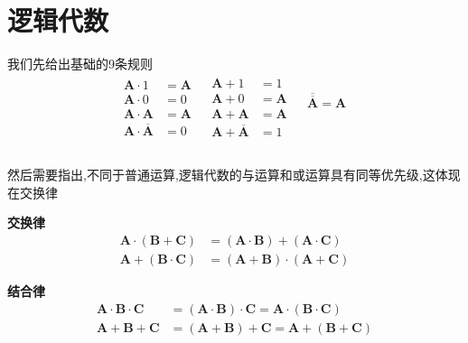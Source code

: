 \section{\K 逻辑代数}
\Par 我们先给出基础的9条规则
\begin{equation*}
    \begin{matrix}
        \begin{aligned}
        \boldsymbol{A}\cdot 1&=\boldsymbol{A}\\
        \boldsymbol{A}\cdot 0&=0\\
        \boldsymbol{A}\cdot \boldsymbol{A}&=\boldsymbol{A}\\
        \boldsymbol{A}\cdot \overline{\boldsymbol{A}}&=0\\
    \end{aligned}&		\begin{aligned}
        \boldsymbol{A}+1&=1\\
        \boldsymbol{A}+0&=\boldsymbol{A}\\
        \boldsymbol{A}+\boldsymbol{A}&=\boldsymbol{A}\\
        \boldsymbol{A}+\overline{\boldsymbol{A}}&=1\\
    \end{aligned}&		\begin{array}{c}
        \overline{\overline{\boldsymbol{A}}}=\boldsymbol{A}\\
        \\
        \\
        \\
    \end{array}\\
    \end{matrix}
\end{equation*}

然后需要指出,不同于普通运算,逻辑代数的与运算和或运算具有同等优先级,这体现在交换律

\textbf{交换律}
\begin{align}
	\boldsymbol{A}\cdot \left( \boldsymbol{B}+\boldsymbol{C} \right) &=\left( \boldsymbol{A}\cdot \boldsymbol{B} \right) +\left( \boldsymbol{A}\cdot \boldsymbol{C} \right)\\
	\boldsymbol{A}+\left( \boldsymbol{B}\cdot \boldsymbol{C} \right) &=\left( \boldsymbol{A}+\boldsymbol{B} \right) \cdot \left( \boldsymbol{A}+\boldsymbol{C} \right)
\end{align}

\textbf{结合律}
\begin{align}
	\boldsymbol{A}\cdot \boldsymbol{B}\cdot \boldsymbol{C}&=\left( \boldsymbol{A}\cdot \boldsymbol{B} \right) \cdot \boldsymbol{C}=\boldsymbol{A}\cdot \left( \boldsymbol{B}\cdot \boldsymbol{C} \right)\\
	\boldsymbol{A}+\boldsymbol{B}+\boldsymbol{C}&=\left( \boldsymbol{A}+\boldsymbol{B} \right) +\boldsymbol{C}=\boldsymbol{A}+\left( \boldsymbol{B}+\boldsymbol{C} \right)
\end{align}

